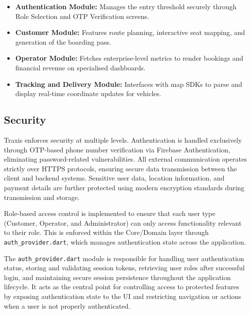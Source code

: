 \begin{itemize}
 \item \textbf{Authentication Module:} Manages the entry threshold
securely through Role Selection and OTP Verification screens.

 \item \textbf{Customer Module:} Features route planning, interactive
seat mapping, and generation of the boarding pass.

 \item \textbf{Operator Module:} Fetches enterprise-level metrics to
render bookings and financial revenue on specialised dashboards.

 \item \textbf{Tracking and Delivery Module:} Interfaces with map SDKs to
parse and display real-time coordinate updates for vehicles.

\end{itemize}


\subsection{Security}

Traxis enforces security at multiple levels. Authentication is handled exclusively through OTP-based phone number verification via Firebase Authentication, eliminating password-related vulnerabilities. All external communication operates strictly over HTTPS protocols, ensuring secure data transmission between the client and backend systems. Sensitive user data, location information, and payment details are further protected using modern encryption standards during transmission and storage.

Role-based access control is implemented to ensure that each user type (Customer, Operator, and Administrator) can only access functionality relevant to their role. This is enforced within the Core/Domain layer through \texttt{auth\_provider.dart}, which manages authentication state across the application.

The \texttt{auth\_provider.dart} module is responsible for handling user authentication status, storing and validating session tokens, retrieving user roles after successful login, and maintaining secure session persistence throughout the application lifecycle. It acts as the central point for controlling access to protected features by exposing authentication state to the UI and restricting navigation or actions when a user is not properly authenticated.


